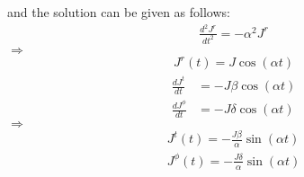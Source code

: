 \documentclass[12pt]{article}
\begin{document}
and the solution can be given as follows:
\begin{align}
\frac{d^2 J^{r}}{d t^2} = - \alpha^2 J^{r}
\end{align}
$\Rightarrow$
\begin{align}
J^{r}(t) = J \cos\left(\alpha t\right)
\end{align}
\begin{align}
\frac{d J^{t}}{d t} &= - J \beta \cos\left(\alpha t\right) \\
\frac{d J^{\phi}}{d t} &= - J \delta \cos\left(\alpha t\right)
\end{align}
$\Rightarrow$
\begin{align}
J^{t}(t) = - \frac{J \beta}{\alpha} \sin\left(\alpha t\right)\\
J^{\phi}(t) = - \frac{J \delta}{\alpha} \sin\left(\alpha t\right)
\end{align}
\end{document}
